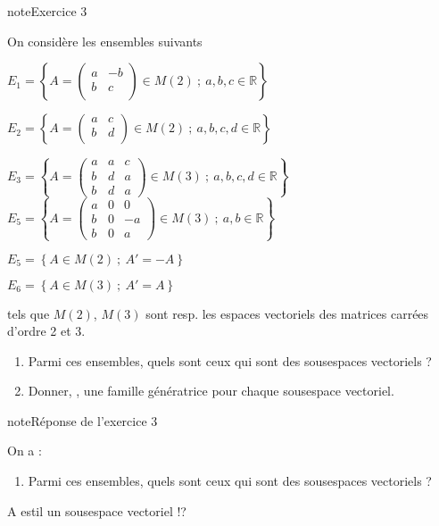 \documentclass[letterpaper,10pt,french]{jupyterBook}
\begin{document}
\begin{sphinxadmonition}{note}{Exercice 3}

\sphinxAtStartPar
On considère les ensembles suivants

\sphinxAtStartPar
\( 
E_1 = \left\{  A = \begin{pmatrix}
a& -b\\
b&c \\
\end{pmatrix} \in M(2) ~;~ 
a,b,c \in \mathbb{R} \right\}
\)

\sphinxAtStartPar
\( 
E_2 = \left\{  A = \begin{pmatrix}
a& c\\
b& d\\
\end{pmatrix} \in M(2) ~;~
a,b,c, d \in \mathbb{R} \right\}
\)

\sphinxAtStartPar
\( 
E_3 = \left\{  A = \begin{pmatrix}
a& a & c\\
b& d & a\\
b& d & a
\end{pmatrix} \in M(3) ~;~
a,b,c, d \in \mathbb{R} \right\}
\)
\( 
E_5 = \left\{  A = \begin{pmatrix}
a& 0 & 0\\
b& 0 & -a\\
b& 0 & a
\end{pmatrix} \in M(3) ~;~
a,b \in \mathbb{R} \right\}
\)

\sphinxAtStartPar
\( 
E_5 = \left\{  A \in M(2) ~;~
A' = -A \right\}
\)

\sphinxAtStartPar
\( 
E_6 = \left\{  A \in M(3) ~;~
A' = A \right\}
\)

\sphinxAtStartPar
tels que \(M(2)\), \(M(3)\) sont resp. les espaces vectoriels des matrices carrées d’ordre 2 et 3.
\begin{enumerate}
%
\item {} 
\sphinxAtStartPar
Parmi ces ensembles, quels sont ceux qui sont des sous\sphinxhyphen{}espaces vectoriels ?

\item {} 
\sphinxAtStartPar
Donner, , une famille génératrice pour chaque sous\sphinxhyphen{}espace vectoriel.

\end{enumerate}
\end{sphinxadmonition}

\begin{sphinxadmonition}{note}{Réponse de l’exercice 3}

\sphinxAtStartPar
On a :
\begin{enumerate}
%
\item {} 
\sphinxAtStartPar
Parmi ces ensembles, quels sont ceux qui sont des sous\sphinxhyphen{}espaces vectoriels ?

\end{enumerate}

\sphinxAtStartPar
A est\sphinxhyphen{}il un sous\sphinxhyphen{}espace vectoriel !?
\end{sphinxadmonition}
\end{document}
